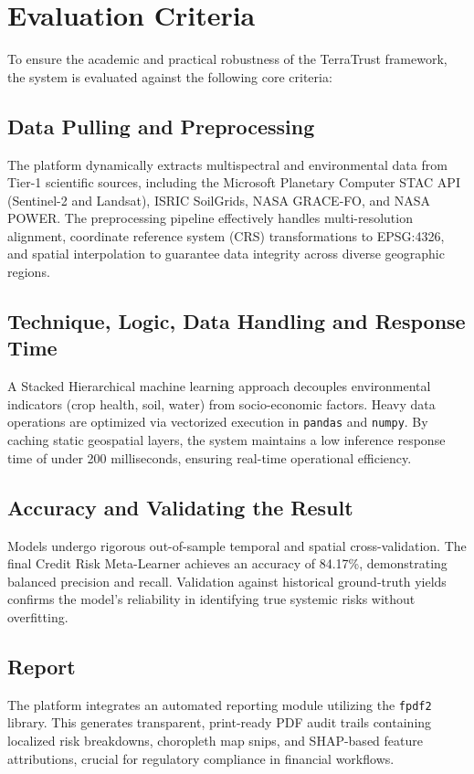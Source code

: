 \documentclass[conference]{IEEEtran}
\begin{document}
\section{\textbf{Evaluation Criteria}}
To ensure the academic and practical robustness of the TerraTrust framework, the system is evaluated against the following core criteria:

\subsection{Data Pulling and Preprocessing}
The platform dynamically extracts multispectral and environmental data from Tier-1 scientific sources, including the Microsoft Planetary Computer STAC API (Sentinel-2 and Landsat), ISRIC SoilGrids, NASA GRACE-FO, and NASA POWER. The preprocessing pipeline effectively handles multi-resolution alignment, coordinate reference system (CRS) transformations to EPSG:4326, and spatial interpolation to guarantee data integrity across diverse geographic regions.

\subsection{Technique, Logic, Data Handling and Response Time}
A Stacked Hierarchical machine learning approach decouples environmental indicators (crop health, soil, water) from socio-economic factors. Heavy data operations are optimized via vectorized execution in \texttt{pandas} and \texttt{numpy}. By caching static geospatial layers, the system maintains a low inference response time of under 200 milliseconds, ensuring real-time operational efficiency.

\subsection{Accuracy and Validating the Result}
Models undergo rigorous out-of-sample temporal and spatial cross-validation. The final Credit Risk Meta-Learner achieves an accuracy of 84.17\%, demonstrating balanced precision and recall. Validation against historical ground-truth yields confirms the model's reliability in identifying true systemic risks without overfitting.

\subsection{Report}
The platform integrates an automated reporting module utilizing the \texttt{fpdf2} library. This generates transparent, print-ready PDF audit trails containing localized risk breakdowns, choropleth map snips, and SHAP-based feature attributions, crucial for regulatory compliance in financial workflows.
\end{document}
